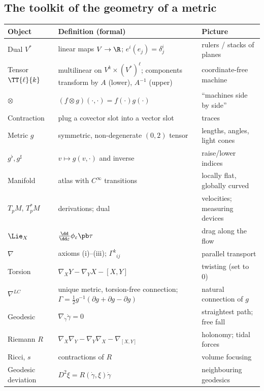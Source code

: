 \subsection{The toolkit of the geometry of a metric}
\begin{center}
\small
\begin{tabular}{@{}p{3.1cm}p{6.2cm}p{5.4cm}@{}}
\toprule
\textbf{Object} & \textbf{Definition (formal)} & \textbf{Picture}\\ \midrule
Dual $V^*$ & linear maps $V\to\R$; $e^{i}(e_j)=\delta^i_j$ & rulers / stacks of planes\\
Tensor $\TT{\ell}{k}$ & multilinear on $V^k\times(V^*)^\ell$; components transform by $A$ (lower), $A^{-1}$ (upper) & coordinate-free machine\\
$\otimes$ & $(f\otimes g)(\cdot,\cdot)=f(\cdot)g(\cdot)$ & ``machines side by side''\\
Contraction & plug a covector slot into a vector slot & traces\\
Metric $g$ & symmetric, non-degenerate $(0,2)$ tensor & lengths, angles, light cones\\
$g^\flat,g^\sharp$ & $v\mapsto g(v,\cdot)$ and inverse & raise/lower indices\\
Manifold & atlas with $C^\infty$ transitions & locally flat, globally curved\\
$T_pM$, $T^*_pM$ & derivations; dual & velocities; measuring devices\\
$\Lie_X$ & $\frac{\dd}{\dd\varepsilon}\phi_\varepsilon\pb\tau$ & drag along the flow\\
$\nabla$ & axioms (i)--(iii); $\Gamma^k{}_{ij}$ & parallel transport\\
Torsion & $\nabla_XY-\nabla_YX-[X,Y]$ & twisting (set to 0)\\
$\nabla^{LC}$ & unique metric, torsion-free connection; $\Gamma=\tfrac12g^{-1}(\partial g+\partial g-\partial g)$ & natural connection of $g$\\
Geodesic & $\nabla_{\dot\gamma}\dot\gamma=0$ & straightest path; free fall\\
Riemann $R$ & $\nabla_X\nabla_Y-\nabla_Y\nabla_X-\nabla_{[X,Y]}$ & holonomy; tidal forces\\
Ricci, $s$ & contractions of $R$ & volume focusing\\
Geodesic deviation & $D^2\xi=R(\dot\gamma,\xi)\dot\gamma$ & neighbouring geodesics\\ \bottomrule
\end{tabular}
\end{center}
